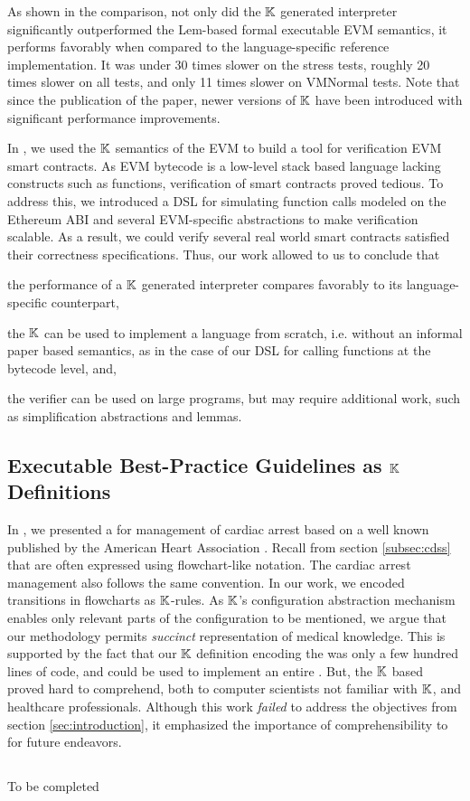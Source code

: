 As shown in the comparison, not only did the $\mathbb{K}$ generated interpreter significantly
outperformed the Lem-based formal executable EVM semantics, it performs
favorably when compared to the language-specific reference implementation.
It was under 30 times slower on the stress tests, roughly 20 times
slower on all tests, and only 11 times slower on VMNormal tests.
Note that since the publication of the paper, newer versions
of $\mathbb{K}$ have been introduced with significant performance improvements.

In \cite{HildenbrandtCSF18,ParkFSE18}, we used the $\mathbb{K}$ semantics of the EVM to
build a tool for verification EVM smart contracts. As EVM bytecode is a
low-level stack based language lacking constructs such as functions,
verification of smart contracts proved tedious. To address this, we
introduced a DSL for simulating function calls modeled on the Ethereum ABI
\cite{ethereumAbiUrl} and several EVM-specific abstractions to make verification
scalable. As a result, we could verify several real world smart contracts
satisfied their correctness specifications. Thus, our work allowed to us
to conclude that
\begin{enumerate*}[label=(\roman*)]
  \item the performance of a $\mathbb{K}$ generated interpreter compares favorably to its
  language-specific counterpart,
  \item the $\mathbb{K}$ can be used to implement a language from scratch, i.e. without
  an informal paper based semantics, as in the case of our DSL for calling
  functions at the bytecode level, and,
  \item the verifier can be used on large programs, but may require additional
  work, such as simplification abstractions and lemmas.
\end{enumerate*}

\subsection{Executable Best-Practice Guidelines as $\mathbb{K}$ Definitions}

In \cite{Saxena22TR}, we presented a \CDSS{} for management of
cardiac arrest based on a well known \BPG{} published by the American Heart
Association \cite{AHAUrl}. Recall from section \ref{subsec:cdss} that
\BPGs{} are often expressed using flowchart-like notation. The cardiac arrest
management \BPG{} also follows the same convention. In our work, we encoded
transitions in \BPG{} flowcharts as $\mathbb{K}$-rules. As $\mathbb{K}$'s
configuration abstraction mechanism enables only relevant parts of the
configuration to be mentioned, we argue that our methodology permits
\emph{succinct} representation of medical knowledge. This is supported by
the fact that our $\mathbb{K}$ definition encoding the \BPG was only a few hundred lines of
code, and could be used to implement an entire \CDSS{}. But, the $\mathbb{K}$ based
\BPG{} proved hard to comprehend, both to computer scientists not familiar with
$\mathbb{K}$, and healthcare professionals. Although this work \emph{failed} to address
the objectives from section \ref{sec:introduction}, it emphasized the importance
of comprehensibility to \HCPs{} for future endeavors.

\subsection{\MediK{}}
To be completed

